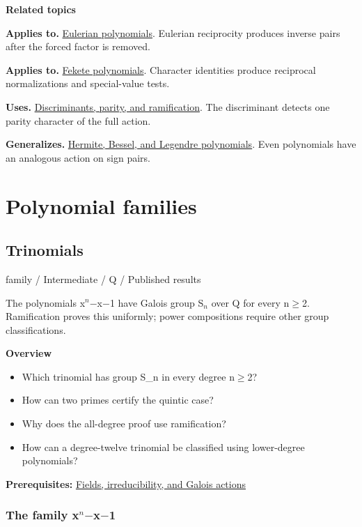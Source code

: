 \documentclass[11pt,a4paper,oneside,openany]{book}
\begin{document}
\par\medskip\begingroup\footnotesize\setlength{\parskip}{1pt}\textbf{\sffamily\color{atlasgreen}Related topics}\par
\color{black}\textbf{Applies to.} \hyperlink{article:eulerian}{Eulerian polynomials}. Eulerian reciprocity produces inverse pairs after the forced factor is removed.\par
\color{black}\textbf{Applies to.} \hyperlink{article:fekete}{Fekete polynomials}. Character identities produce reciprocal normalizations and special-value tests.\par
\color{black}\textbf{Uses.} \hyperlink{article:discriminants}{Discriminants, parity, and ramification}. The discriminant detects one parity character of the full action.\par
\color{black}\textbf{Generalizes.} \hyperlink{article:orthogonal-families}{Hermite, Bessel, and Legendre polynomials}. Even polynomials have an analogous action on sign pairs.\par
\endgroup
\part{Polynomial families}
\chapter{Trinomials}\label{article:trinomials}\hypertarget{article:trinomials}{}\color{black}
{\sffamily\small\color{atlasgold}family / Intermediate / Q / Published results}\par\medskip
The polynomials x\ensuremath{{}^n}\ensuremath{-}x\ensuremath{-}1 have Galois group S\ensuremath{{}_n} over Q for every n\ensuremath{\ge}2. Ramification proves this uniformly; power compositions require other group classifications.\par\medskip
\textbf{Overview}\begin{itemize}
\item Which trinomial has group S\_\allowbreak{}n in every degree n\ensuremath{\ge}2?
\item How can two primes certify the quintic case?
\item Why does the all-degree proof use ramification?
\item How can a degree-twelve trinomial be classified using lower-degree polynomials?
\end{itemize}
{\small\textbf{Prerequisites:} \hyperlink{article:foundations}{Fields, irreducibility, and Galois actions}}\par
{}\section{The family x\ensuremath{{}^n}\ensuremath{-}x\ensuremath{-}1}
\end{document}
